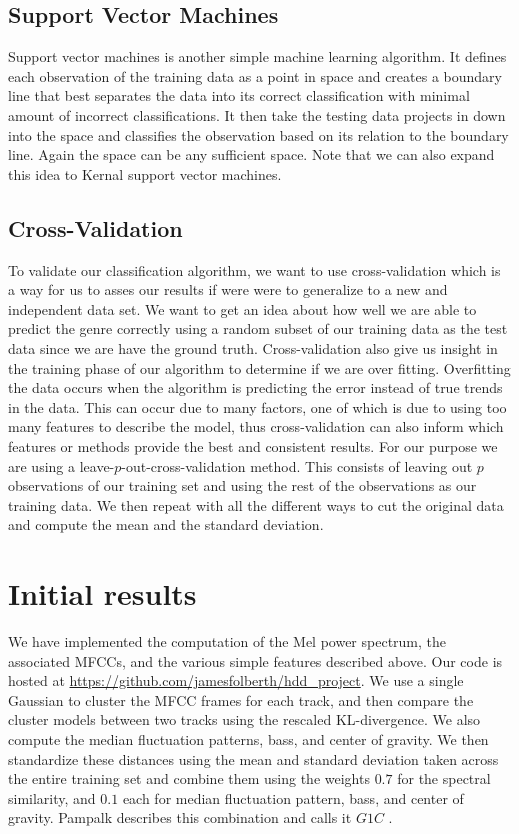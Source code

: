\documentclass[12pt]{article}
\begin{document}
\subsection{Support Vector Machines} 
Support vector machines is another simple machine learning algorithm. It defines each observation of the training data as a point in space and creates a boundary line that best separates the data into its correct classification with minimal amount of incorrect classifications. It then take the testing data projects in down into the space and classifies the observation based on its relation to the boundary line. Again the space can be any sufficient space. Note that we can also expand this idea to Kernal support vector machines. 

\subsection{Cross-Validation}


To validate our classification algorithm, we want to use cross-validation which is a way for us to asses our results if were were to generalize to a new and independent data set. We want to get an idea about how well we are able to predict the genre correctly using a random subset of our training data as the test data since we are have the ground truth. Cross-validation also give us insight in the training phase of our algorithm to determine if we are over fitting. Overfitting the data occurs when the algorithm is predicting the error instead of true trends in the data. This can occur due to many factors, one of which is due to using too many features to describe the model, thus cross-validation can also inform which features or methods provide the best and consistent results. For our purpose we are using a leave-$p$-out-cross-validation method. This consists of leaving out $p$ observations of our training set and using the rest of the observations as our training data. We then repeat with all the different ways to cut the original data and compute the mean and the standard deviation. 

\section{Initial results}

We have implemented the computation of the Mel power spectrum, the associated MFCCs, and the various simple features described above.  Our code is hosted at \url{https://github.com/jamesfolberth/hdd_project}.  We use a single Gaussian to cluster the MFCC frames for each track, and then compare the cluster models between two tracks using the rescaled KL-divergence.  We also compute the median fluctuation patterns, bass, and center of gravity.  We then standardize these distances using the mean and standard deviation taken across the entire training set and combine them using the weights $0.7$ for the spectral similarity, and $0.1$ each for median fluctuation pattern, bass, and center of gravity.  Pampalk describes this combination and calls it $G1C$ \cite{pampalk:dissertation}.\\
\end{document}
